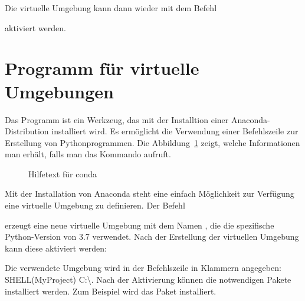 \medskip


Die virtuelle Umgebung kann dann wieder mit dem Befehl 

\medskip



\medskip

aktiviert werden.




\section{Programm  für virtuelle Umgebungen}

Das Programm  ist ein Werkzeug, das mit der Installtion einer Anaconda-Distribution installiert wird. Es ermöglicht die Verwendung einer Befehlszeile zur Erstellung von Pythonprogrammen. Die Abbildung~\ref{env:conda}  zeigt, welche Informationen man erhält, falls man das Kommando  aufruft.

\bigskip

\begin{figure}
	
	\caption{Hilfetext für conda}
	
	\label{env:conda}  
\end{figure}

\bigskip

Mit der Installation von Anaconda steht eine einfach Möglichkeit zur Verfügung eine virtuelle Umgebung zu definieren. Der Befehl


	
erzeugt eine neue virtuelle Umgebung mit dem Namen , die die spezifische Python-Version von 3.7 verwendet. Nach der Erstellung der virtuellen Umgebung kann diese aktiviert werden:

\medskip


\medskip

Die verwendete Umgebung wird in der Befehlszeile in Klammern angegeben: SHELL{(MyProject) C:\textbackslash}. Nach der Aktivierung können die notwendigen Pakete installiert werden.  Zum Beispiel wird das Paket  installiert.

    \medskip
     
     
